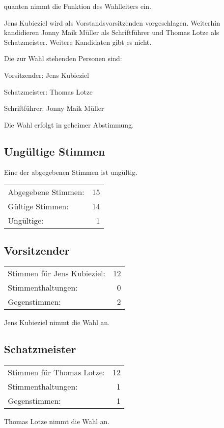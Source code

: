 \documentclass[DIV=calc,parksip=half*]{scrartcl}
\newcommand{\qbi}{Jens Kubieziel}
\newcommand{\jonny}{Jonny Maik Müller}
\newcommand{\thomas}{Thomas Lotze}
\newcommand{\quanten}{quanten}
\begin{document}
\quanten{} nimmt die Funktion des Wahlleiters ein.

\qbi{} wird als Vorstandsvorsitzenden vorgeschlagen. Weiterhin kandidieren
\jonny{} als Schriftführer und \thomas{} als Schatzmeister. Weitere Kandidaten
gibt es nicht.

Die zur Wahl stehenden Personen sind:
\begin{compactenum}
\item Vorsitzender: \qbi{}
\item Schatzmeister: \thomas{}
\item Schriftführer: \jonny{}
\end{compactenum}

Die Wahl erfolgt in geheimer Abstimmung.

\subsection*{Ungültige Stimmen}

Eine der abgegebenen Stimmen ist ungültig.

\begin{tabularx}{\linewidth}{Xr}
Abgegebene Stimmen: & 15 \\
  Gültige Stimmen: & 14 \\
  Ungültige: & 1\\
\end{tabularx}

\subsection{Vorsitzender}
\begin{tabularx}{\linewidth}{Xr}
Stimmen für \qbi{}: & 12 \\
  Stimmenthaltungen: & 0 \\
  Gegenstimmen: & 2\\
\end{tabularx}
\qbi{} nimmt die Wahl an.

\subsection{Schatzmeister}
\begin{tabularx}{\linewidth}{Xr}
Stimmen für \thomas{}: & 12\\
Stimmenthaltungen: & 1 \\
Gegenstimmen: & 1
\end{tabularx}
\thomas{} nimmt die Wahl an.
\end{document}
